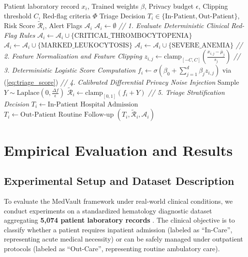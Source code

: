 \documentclass[conference]{IEEEtran}
\begin{document}
\begin{algorithm}[t]
\caption{Privacy-Preserving Clinical Triage and Risk Estimation}
\label{alg:triage}
\begin{algorithmic}[1]
\REQUIRE Patient laboratory record $x_i$, Trained weights $\beta$, Privacy budget $\epsilon$, Clipping threshold $C$, Red-flag criteria $\Phi$
\ENSURE Triage Decision $T_i \in \{\text{In-Patient}, \text{Out-Patient}\}$, Risk Score $\tilde{\mathcal{R}}_i$, Alert Flags $\mathcal{A}_i$
\STATE $\mathcal{A}_i \leftarrow \emptyset$
\STATE \textit{// 1. Evaluate Deterministic Clinical Red-Flag Rules}
    \STATE $\mathcal{A}_i \leftarrow \mathcal{A}_i \cup \{\text{CRITICAL\_THROMBOCYTOPENIA}\}$
\ENDIF
{}
    \STATE $\mathcal{A}_i \leftarrow \mathcal{A}_i \cup \{\text{MARKED\_LEUKOCYTOSIS}\}$
\ENDIF
{}
    \STATE $\mathcal{A}_i \leftarrow \mathcal{A}_i \cup \{\text{SEVERE\_ANEMIA}\}$
\ENDIF
\STATE \textit{// 2. Feature Normalization and Feature Clipping}
    \STATE $z_{i,j} \leftarrow \text{clamp}_{[-C, C]}\left( \frac{x_{i,j} - \bar{\mu}_j}{s_j} \right)$
\ENDFOR
\STATE \textit{// 3. Deterministic Logistic Score Computation}
\STATE $f_i \leftarrow \sigma(\beta_0 + \sum_{j=1}^d \beta_j z_{i,j})$ via (\ref{eq:triage_score})
\STATE \textit{// 4. Calibrated Differential Privacy Noise Injection}
\STATE Sample $Y \sim \text{Laplace}\left(0, \frac{\Delta f}{\epsilon}\right)$
\STATE $\tilde{\mathcal{R}}_i \leftarrow \text{clamp}_{[0, 1]}(f_i + Y)$
\STATE \textit{// 5. Triage Stratification Decision}
    \STATE $T_i \leftarrow \text{In-Patient Hospital Admission}$
\ELSE
    \STATE $T_i \leftarrow \text{Out-Patient Routine Follow-up}$
\ENDIF
\RETURN $(T_i, \tilde{\mathcal{R}}_i, \mathcal{A}_i)$
\end{algorithmic}
\end{algorithm}

\section{Empirical Evaluation and Results}
\label{sec:evaluation}

\subsection{Experimental Setup and Dataset Description}
To evaluate the MedVault framework under real-world clinical conditions, we conduct experiments on a standardized hematology diagnostic dataset aggregating \textbf{5,074 patient laboratory records} \cite{britton2016complete, sharma2023benchmarking}. The clinical objective is to classify whether a patient requires inpatient admission (labeled as ``In-Care'', representing acute medical necessity) or can be safely managed under outpatient protocols (labeled as ``Out-Care'', representing routine ambulatory care).
\end{document}
